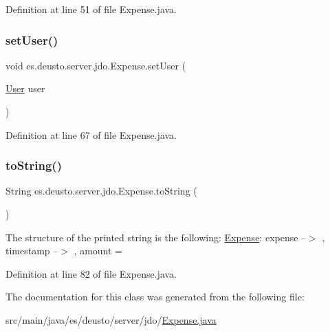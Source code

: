 Definition at line 51 of file Expense.\+java.

\mbox{\label{classes_1_1deusto_1_1server_1_1jdo_1_1_expense_ab15c5d072af65f8a6f09467e6567db5b}} 
\subsubsection{\texorpdfstring{set\+User()}{setUser()}}
{\footnotesize\ttfamily void es.\+deusto.\+server.\+jdo.\+Expense.\+set\+User (\begin{DoxyParamCaption}\item[{\hyperlink{classes_1_1deusto_1_1server_1_1jdo_1_1_user}{User}}]{user }\end{DoxyParamCaption})}



Definition at line 67 of file Expense.\+java.

\mbox{\label{classes_1_1deusto_1_1server_1_1jdo_1_1_expense_a0f197f3e223803cab5fba71cc481af31}} 
\subsubsection{\texorpdfstring{to\+String()}{toString()}}
{\footnotesize\ttfamily String es.\+deusto.\+server.\+jdo.\+Expense.\+to\+String (\begin{DoxyParamCaption}{ }\end{DoxyParamCaption})}

The structure of the printed string is the following\+: \hyperlink{classes_1_1deusto_1_1server_1_1jdo_1_1_expense}{Expense}\+: expense --$>$ , timestamp --$>$ , amount = 

Definition at line 82 of file Expense.\+java.



The documentation for this class was generated from the following file\+:\begin{DoxyCompactItemize}
\item 
src/main/java/es/deusto/server/jdo/\hyperlink{_expense_8java}{Expense.\+java}\end{DoxyCompactItemize}
